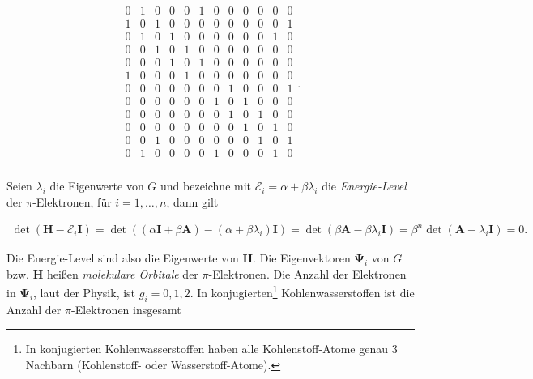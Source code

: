 {\begin{minipage}{\linewidth}
\begin{align*}
{\begin{array}{cccccccccccc}
                            0 & 1 & 0 & 0 & 0 & 1 & 0 & 0 & 0 & 0 & 0 & 0 \\
                            1 & 0 & 1 & 0 & 0 & 0 & 0 & 0 & 0 & 0 & 0 & 1 \\
                            0 & 1 & 0 & 1 & 0 & 0 & 0 & 0 & 0 & 0 & 1 & 0 \\
                            0 & 0 & 1 & 0 & 1 & 0 & 0 & 0 & 0 & 0 & 0 & 0 \\
                            0 & 0 & 0 & 1 & 0 & 1 & 0 & 0 & 0 & 0 & 0 & 0 \\
                            1 & 0 & 0 & 0 & 1 & 0 & 0 & 0 & 0 & 0 & 0 & 0 \\
                            0 & 0 & 0 & 0 & 0 & 0 & 0 & 1 & 0 & 0 & 0 & 1 \\
                            0 & 0 & 0 & 0 & 0 & 0 & 1 & 0 & 1 & 0 & 0 & 0 \\
                            0 & 0 & 0 & 0 & 0 & 0 & 0 & 1 & 0 & 1 & 0 & 0 \\
                            0 & 0 & 0 & 0 & 0 & 0 & 0 & 0 & 1 & 0 & 1 & 0 \\
                            0 & 0 & 1 & 0 & 0 & 0 & 0 & 0 & 0 & 1 & 0 & 1 \\
                            0 & 1 & 0 & 0 & 0 & 0 & 1 & 0 & 0 & 0 & 1 & 0 \\
                        \end{array}
                    }.
                \end{align*}
            \end{minipage}
        }

        \phantom{}

        Seien $\lambda_i$ die Eigenwerte von $G$ und bezeichne mit $\mathcal E_i = \alpha + \beta \lambda_i$ die \textit{Energie-Level} der $\pi$-Elektronen, für $i = 1, \dots, n$, dann gilt

        \begin{align*}
            \det(\mathbf H - \mathcal E_i \mathbf I)
            =
            \det
            (
                (\alpha \mathbf I + \beta \mathbf A)
                -
                (\alpha + \beta \lambda_i) \mathbf I
            )
            =
            \det(\beta \mathbf A - \beta \lambda_i \mathbf I)
            =
            \beta^n \det(\mathbf A - \lambda_i \mathbf I)
            =
            0.
        \end{align*}

        Die Energie-Level sind also die Eigenwerte von $\mathbf H$.
        Die Eigenvektoren $\mathbf \Psi_i$ von $G$ bzw. $\mathbf H$ heißen \textit{molekulare Orbitale} der $\pi$-Elektronen.
        Die Anzahl der Elektronen in $\mathbf \Psi_i$, laut der Physik, ist $g_i = 0, 1, 2$.
        In konjugierten\footnote{In konjugierten Kohlenwasserstoffen haben alle Kohlenstoff-Atome genau $3$ Nachbarn (Kohlenstoff- oder Wasserstoff-Atome).} Kohlenwasserstoffen ist die Anzahl der $\pi$-Elektronen insgesamt

